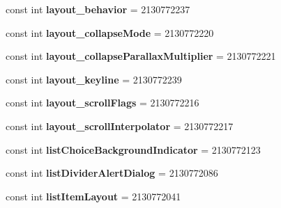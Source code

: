 \begin{DoxyCompactItemize}
const int {\bfseries layout\+\_\+behavior} = 2130772237
\item 
\mbox{\label{class_sample_app_1_1_droid_1_1_resource_1_1_attribute_a30500deccd97ecdf334a1cbc2421f1c7}} 
const int {\bfseries layout\+\_\+collapse\+Mode} = 2130772220
\item 
\mbox{\label{class_sample_app_1_1_droid_1_1_resource_1_1_attribute_a9ea824e59a234877a9b57a342d196550}} 
const int {\bfseries layout\+\_\+collapse\+Parallax\+Multiplier} = 2130772221
\item 
\mbox{\label{class_sample_app_1_1_droid_1_1_resource_1_1_attribute_a2a2dd5a7fa1fe56937a17b50c8f1fb9d}} 
const int {\bfseries layout\+\_\+keyline} = 2130772239
\item 
\mbox{\label{class_sample_app_1_1_droid_1_1_resource_1_1_attribute_a97e2354fee3d2fc46fdd8b46580d5f20}} 
const int {\bfseries layout\+\_\+scroll\+Flags} = 2130772216
\item 
\mbox{\label{class_sample_app_1_1_droid_1_1_resource_1_1_attribute_a338dfb44b4d2151fb6dd9c686a18ac6a}} 
const int {\bfseries layout\+\_\+scroll\+Interpolator} = 2130772217
\item 
\mbox{\label{class_sample_app_1_1_droid_1_1_resource_1_1_attribute_a4954e8e4f56b8bf3e76b8da029224ad1}} 
const int {\bfseries list\+Choice\+Background\+Indicator} = 2130772123
\item 
\mbox{\label{class_sample_app_1_1_droid_1_1_resource_1_1_attribute_ae7a6c9569d30c6452049ed30135047c3}} 
const int {\bfseries list\+Divider\+Alert\+Dialog} = 2130772086
\item 
\mbox{\label{class_sample_app_1_1_droid_1_1_resource_1_1_attribute_aff059aa6e6cf99bc27331e910a05ab26}} 
const int {\bfseries list\+Item\+Layout} = 2130772041
\item 

\end{DoxyCompactItemize}
